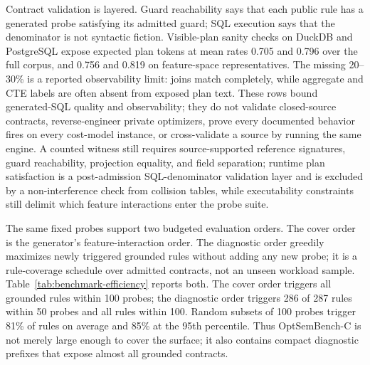 Contract validation is layered.  Guard reachability says that each public rule has a generated probe satisfying its admitted guard; SQL execution says that the denominator is not syntactic fiction.  Visible-plan sanity checks on DuckDB and PostgreSQL expose expected plan tokens at mean rates 0.705 and 0.796 over the full corpus, and 0.756 and 0.819 on feature-space representatives.  The missing 20--30\% is a reported observability limit: joins match completely, while aggregate and CTE labels are often absent from exposed plan text.  These rows bound generated-SQL quality and observability; they do not validate closed-source contracts, reverse-engineer private optimizers, prove every documented behavior fires on every cost-model instance, or cross-validate a source by running the same engine.  A counted witness still requires source-supported reference signatures, guard reachability, projection equality, and field separation; runtime plan satisfaction is a post-admission SQL-denominator validation layer and is excluded by a non-interference check from collision tables, while executability constraints still delimit which feature interactions enter the probe suite.

The same fixed probes support two budgeted evaluation orders.  The cover order is the generator's feature-interaction order.  The diagnostic order greedily maximizes newly triggered grounded rules without adding any new probe; it is a rule-coverage schedule over admitted contracts, not an unseen workload sample.  Table~\ref{tab:benchmark-efficiency} reports both.  The cover order triggers all grounded rules within 100 probes; the diagnostic order triggers 286 of 287 rules within 50 probes and all rules within 100.  Random subsets of 100 probes trigger 81\% of rules on average and 85\% at the 95th percentile.  Thus OptSemBench-C is not merely large enough to cover the surface; it also contains compact diagnostic prefixes that expose almost all grounded contracts.



